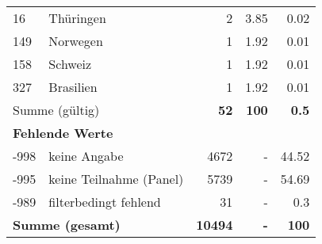\begin{longtable}{lXrrr}
     16 &
     \multicolumn{1}{X}{ Thüringen   } &


       \num{2} &
       \num[round-mode=places,round-precision=2]{3,85} &
         \num[round-mode=places,round-precision=2]{0,02} \\

     149 &
     \multicolumn{1}{X}{ Norwegen   } &


       \num{1} &
       \num[round-mode=places,round-precision=2]{1,92} &
         \num[round-mode=places,round-precision=2]{0,01} \\

     158 &
     \multicolumn{1}{X}{ Schweiz   } &


       \num{1} &
       \num[round-mode=places,round-precision=2]{1,92} &
         \num[round-mode=places,round-precision=2]{0,01} \\

     327 &
     \multicolumn{1}{X}{ Brasilien   } &


       \num{1} &
       \num[round-mode=places,round-precision=2]{1,92} &
         \num[round-mode=places,round-precision=2]{0,01} \\
     \midrule
     \multicolumn{2}{l}{Summe (gültig)} &
       \textbf{\num{52}} &
     \textbf{100} &
       \textbf{\num[round-mode=places,round-precision=2]{0,5}} \\
     \multicolumn{5}{l}{\textbf{Fehlende Werte}}\\
       -998 &
       keine Angabe &
         \num{4672} &
        - &
         \num[round-mode=places,round-precision=2]{44,52} \\
       -995 &
       keine Teilnahme (Panel) &
         \num{5739} &
        - &
         \num[round-mode=places,round-precision=2]{54,69} \\
       -989 &
       filterbedingt fehlend &
         \num{31} &
        - &
         \num[round-mode=places,round-precision=2]{0,3} \\
     \midrule
     \multicolumn{2}{l}{\textbf{Summe (gesamt)}} &
          \textbf{\num{10494}} &
        \textbf{-} &
        \textbf{100} \\
     \bottomrule
     \end{longtable}
     

